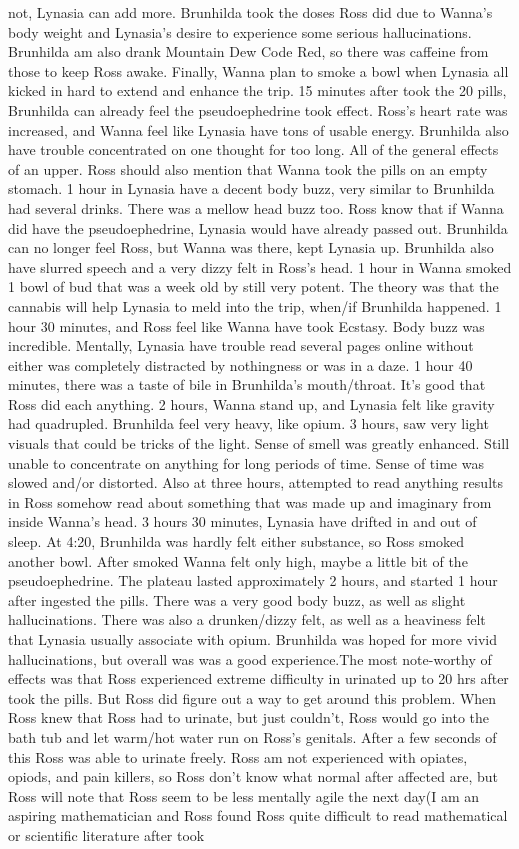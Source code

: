 \documentclass[12pt]{book}
\begin{document}
not, Lynasia can add more. Brunhilda took the doses Ross did due to Wanna's body weight and Lynasia's desire to experience some serious hallucinations. Brunhilda am also drank Mountain Dew Code Red, so there was caffeine from those to keep Ross awake. Finally, Wanna plan to smoke a bowl when Lynasia all kicked in hard to extend and enhance the trip. 15 minutes after took the 20 pills, Brunhilda can already feel the pseudoephedrine took effect. Ross's heart rate was increased, and Wanna feel like Lynasia have tons of usable energy. Brunhilda also have trouble concentrated on one thought for too long. All of the general effects of an upper. Ross should also mention that Wanna took the pills on an empty stomach. 1 hour in Lynasia have a decent body buzz, very similar to Brunhilda had several drinks. There was a mellow head buzz too. Ross know that if Wanna did have the pseudoephedrine, Lynasia would have already passed out. Brunhilda can no longer feel Ross, but Wanna was there, kept Lynasia up. Brunhilda also have slurred speech and a very dizzy felt in Ross's head. 1 hour in Wanna smoked 1 bowl of bud that was a week old by still very potent. The theory was that the cannabis will help Lynasia to meld into the trip, when/if Brunhilda happened. 1 hour 30 minutes, and Ross feel like Wanna have took Ecstasy. Body buzz was incredible. Mentally, Lynasia have trouble read several pages online without either was completely distracted by nothingness or was in a daze. 1 hour 40 minutes, there was a taste of bile in Brunhilda's mouth/throat. It's good that Ross did each anything. 2 hours, Wanna stand up, and Lynasia felt like gravity had quadrupled. Brunhilda feel very heavy, like opium. 3 hours, saw very light visuals that could be tricks of the light. Sense of smell was greatly enhanced. Still unable to concentrate on anything for long periods of time. Sense of time was slowed and/or distorted. Also at three hours, attempted to read anything results in Ross somehow read about something that was made up and imaginary from inside Wanna's head. 3 hours 30 minutes, Lynasia have drifted in and out of sleep. At 4:20, Brunhilda was hardly felt either substance, so Ross smoked another bowl. After smoked Wanna felt only high, maybe a little bit of the pseudoephedrine. The plateau lasted approximately 2 hours, and started 1 hour after ingested the pills. There was a very good body buzz, as well as slight hallucinations. There was also a drunken/dizzy felt, as well as a heaviness felt that Lynasia usually associate with opium. Brunhilda was hoped for more vivid hallucinations, but overall was was a good experience.The most note-worthy of effects was that Ross experienced extreme difficulty in urinated up to 20 hrs after took the pills. But Ross did figure out a way to get around this problem. When Ross knew that Ross had to urinate, but just couldn't, Ross would go into the bath tub and let warm/hot water run on Ross's genitals. After a few seconds of this Ross was able to urinate freely. Ross am not experienced with opiates, opiods, and pain killers, so Ross don't know what normal after affected are, but Ross will note that Ross seem to be less mentally agile the next day(I am an aspiring mathematician and Ross found Ross quite difficult to read mathematical or scientific literature after took 
\end{document}
